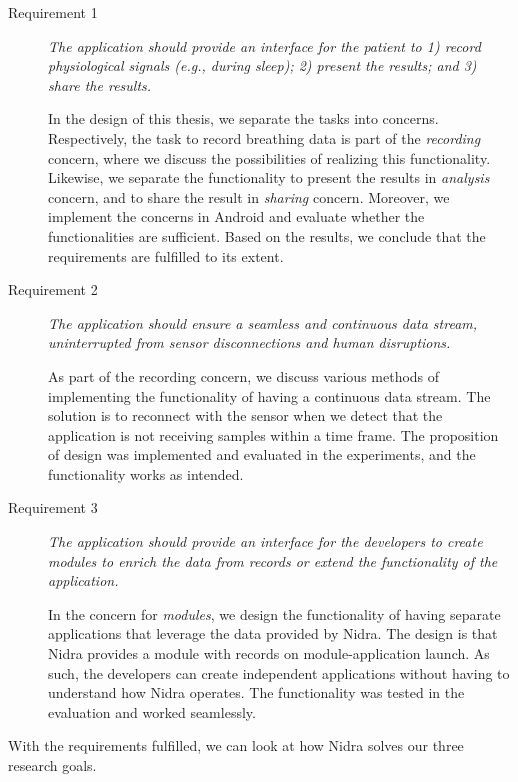 \begin{description}
    \item[Requirement 1] \textit{The application should provide an interface for the patient to 1) record physiological signals (e.g., during sleep); 2) present the results; and 3) share the results.}
    
    In the design of this thesis, we separate the tasks into concerns. Respectively, the task to record breathing data is part of the \textit{recording} concern, where we discuss the possibilities of realizing this functionality. Likewise, we separate the functionality to present the results in \textit{analysis} concern, and to share the result in \textit{sharing} concern. Moreover, we implement the concerns in Android and evaluate whether the functionalities are sufficient. Based on the results, we conclude that the requirements are fulfilled to its extent.
    
    \item[Requirement 2] \textit{The application should ensure a seamless and continuous data stream, uninterrupted from sensor disconnections and human disruptions.}
        
    As part of the recording concern, we discuss various methods of implementing the functionality of having a continuous data stream. The solution is to reconnect with the sensor when we detect that the application is not receiving samples within a time frame. The proposition of design was implemented and evaluated in the experiments, and the functionality works as intended.

    \item[Requirement 3] \textit{The application should provide an interface for the developers to create modules to enrich the data from records or extend the functionality of the application.}

    In the concern for \textit{modules}, we design the functionality of having separate applications that leverage the data provided by Nidra. The design is that Nidra provides a module with records on module-application launch. As such, the developers can create independent applications without having to understand how Nidra operates. The functionality was tested in the evaluation and worked seamlessly.

\end{description}

With the requirements fulfilled, we can look at how Nidra solves our three research goals.

